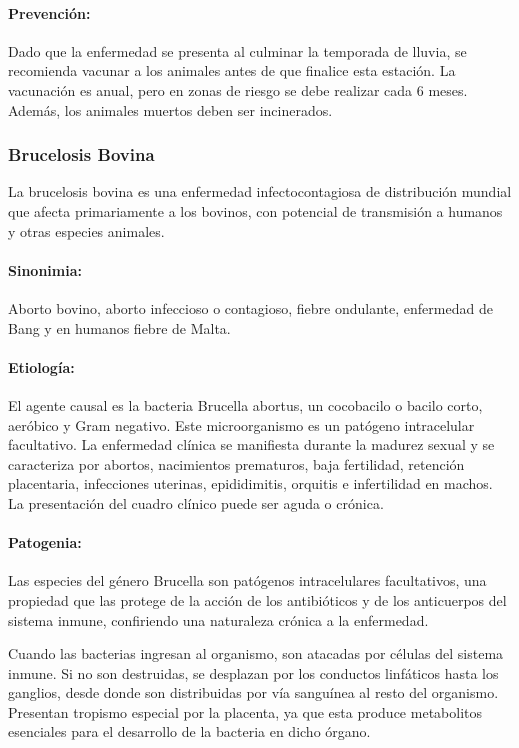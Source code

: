             \paragraph{Prevención:} Dado que la enfermedad se presenta al culminar la temporada de lluvia, se recomienda vacunar a los animales antes de que finalice esta estación. La vacunación es anual, pero en zonas de riesgo se debe realizar cada 6 meses. Además, los animales muertos deben ser incinerados. 

        \subsubsection{Brucelosis Bovina}

            La brucelosis bovina es una enfermedad infectocontagiosa de distribución mundial que afecta primariamente a los bovinos, con potencial de transmisión a humanos y otras especies animales.

            \paragraph{Sinonimia:} Aborto bovino, aborto infeccioso o contagioso, fiebre ondulante, enfermedad de Bang y en humanos fiebre de Malta.

            \paragraph{Etiología:} El agente causal es la bacteria Brucella abortus, un cocobacilo o bacilo corto, aeróbico y Gram negativo. Este microorganismo es un patógeno intracelular facultativo. La enfermedad clínica se manifiesta durante la madurez sexual y se caracteriza por abortos, nacimientos prematuros, baja fertilidad, retención placentaria, infecciones uterinas, epididimitis, orquitis e infertilidad en machos. La presentación del cuadro clínico puede ser aguda o crónica.

            \paragraph{Patogenia:} Las especies del género Brucella son patógenos intracelulares facultativos, una propiedad que las protege de la acción de los antibióticos y de los anticuerpos del sistema inmune, confiriendo una naturaleza crónica a la enfermedad.

            Cuando las bacterias ingresan al organismo, son atacadas por células del sistema inmune. Si no son destruidas, se desplazan por los conductos linfáticos hasta los ganglios, desde donde son distribuidas por vía sanguínea al resto del organismo. Presentan tropismo especial por la placenta, ya que esta produce metabolitos esenciales para el desarrollo de la bacteria en dicho órgano. 

